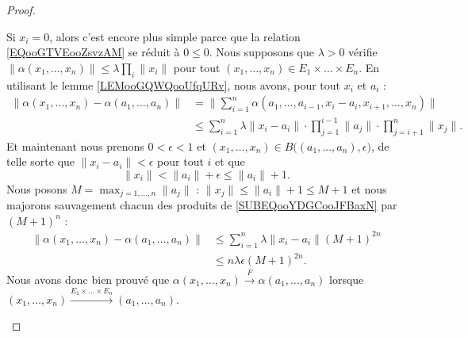 \begin{proof}
\begin{subproof}
		Si \( x_i=0\), alors c'est encore plus simple parce que la relation \eqref{EQooGTVEooZsvzAM} se réduit à \( 0\leq 0\).
		\spitem[\( \Leftarrow\)]
		Nous supposons que \( \lambda>0\) vérifie \( \| \alpha(x_1,\ldots,x_n) \|\leq \lambda \prod_i\| x_i \|\) pour tout \( (x_1,\ldots,x_n)\in E_1\times \ldots\times E_n\). En utilisant le lemme \ref{LEMooGQWQooUfqURv}, nous avons, pour tout \( x_i\) et \( a_i\) :
		\begin{subequations}
			\begin{align}
				\| \alpha(x_1,\ldots,x_n)-\alpha(a_1,\ldots,a_n) \| & =\| \sum_{i=1}^n\alpha(a_1,\ldots,a_{i-1},x_i-a_i,x_{i+1},\ldots,x_n) \|                                                           \\
				                                                    & \leq \sum_{i=1}^n  \lambda  \| x_i-a_i \|\cdot \prod_{j=1}^{i-1}\| a_j \|\cdot\prod_{j=i+1}^n\| x_j \|.		\label{SUBEQooYDGCooJFBaxN}
			\end{align}
		\end{subequations}
		Et maintenant nous prenons \( 0<\epsilon<1\) et \( (x_1,\ldots,x_n)\in B\big( (a_1,\ldots,a_n),\epsilon \big)\), de telle sorte que \( \| x_i-a_i \|<\epsilon\) pour tout \( i\) et que
		\begin{equation}
			\| x_i \|<\| a_i \|+\epsilon\leq \| a_i \|+1.
		\end{equation}
		Nous posons \( M=\max_{j=1,\ldots,n}\| a_j \|\) : \( \| x_j \|\leq \| a_i \|+1\leq M+1\) et nous majorons sauvagement chacun des produits de \eqref{SUBEQooYDGCooJFBaxN} par \( (M+1)^n\) :
		\begin{subequations}
			\begin{align}
				\| \alpha(x_1,\ldots,x_n)-\alpha(a_1,\ldots,a_n) \| & \leq \sum_{i=1}^n\lambda \| x_i-a_i \|(M+1)^{2n} \\
				                                                    & \leq n\lambda \epsilon (M+1)^{2n}.
			\end{align}
		\end{subequations}
		Nous avons donc bien prouvé que \( \alpha(x_1,\ldots,x_n)\stackrel{F}{\longrightarrow} \alpha(a_1,\ldots,a_n) \) lorsque \( (x_1,\ldots,x_n)\stackrel{ E_1\times \ldots\times E_n}{\longrightarrow} (a_1,\ldots,a_n) \).

	\end{subproof}
\end{proof}


